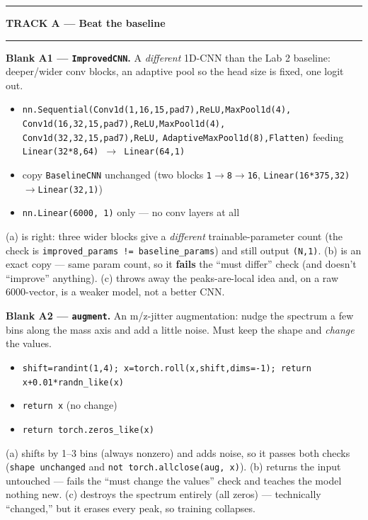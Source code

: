 \documentclass[11pt]{article}
\newcommand{\opt}[1]{\texttt{#1}}
\begin{document}
\vspace{3pt}\hrule
\begin{center}\textbf{TRACK A --- Beat the baseline}\end{center}\hrule\vspace{4pt}

\textbf{Blank A1 --- \opt{ImprovedCNN}.}\; {\small A \emph{different} 1D-CNN than the Lab 2 baseline:
deeper/wider conv blocks, an adaptive pool so the head size is fixed, one logit out.}
\begin{itemize}
  \item[(a)] \opt{nn.Sequential(Conv1d(1,16,15,pad7),ReLU,MaxPool1d(4),}
    \opt{Conv1d(16,32,15,pad7),ReLU,MaxPool1d(4),} \opt{Conv1d(32,32,15,pad7),ReLU,}
    \opt{AdaptiveMaxPool1d(8),Flatten)} feeding \opt{Linear(32*8,64) $\to$ Linear(64,1)}
  \item[(b)] copy \opt{BaselineCNN} unchanged (two blocks \opt{1$\to$8$\to$16}, \opt{Linear(16*375,32)$\to$Linear(32,1)})
  \item[(c)] \opt{nn.Linear(6000, 1)} only --- no conv layers at all
\end{itemize}
{\small (a) is right: three wider blocks give a \emph{different} trainable-parameter count (the check is
\opt{improved\_params != baseline\_params}) and still output \opt{(N,1)}. (b) is an exact copy --- same
param count, so it \textbf{fails} the ``must differ'' check (and doesn't ``improve'' anything). (c) throws
away the peaks-are-local idea and, on a raw 6000-vector, is a weaker model, not a better CNN.}

\vspace{3pt}
\textbf{Blank A2 --- \opt{augment}.}\; {\small An m/z-jitter augmentation: nudge the spectrum a few bins
along the mass axis and add a little noise. Must keep the shape and \emph{change} the values.}
\begin{itemize}
  \item[(a)] \opt{shift=randint(1,4); x=torch.roll(x,shift,dims=-1); return x+0.01*randn\_like(x)}
  \item[(b)] \opt{return x} \quad(no change)
  \item[(c)] \opt{return torch.zeros\_like(x)}
\end{itemize}
{\small (a) shifts by 1--3 bins (always nonzero) and adds noise, so it passes both checks
(\opt{shape unchanged} and \opt{not torch.allclose(aug, x)}). (b) returns the input untouched --- fails
the ``must change the values'' check and teaches the model nothing new. (c) destroys the spectrum
entirely (all zeros) --- technically ``changed,'' but it erases every peak, so training collapses.}
\end{document}
